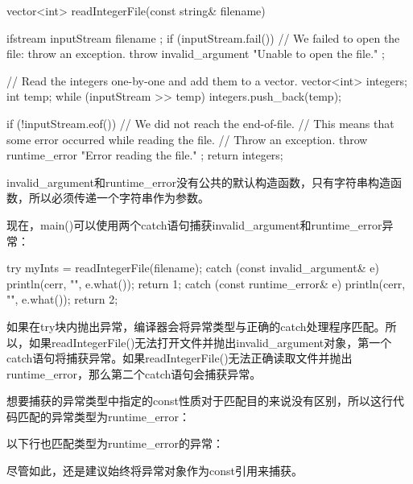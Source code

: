 \begin{cpp}
vector<int> readIntegerFile(const string& filename)
{
    ifstream inputStream { filename };
    if (inputStream.fail()) {
        // We failed to open the file: throw an exception.
        throw invalid_argument { "Unable to open the file." };
    }

    // Read the integers one-by-one and add them to a vector.
    vector<int> integers;
    int temp;
    while (inputStream >> temp) {
        integers.push_back(temp);
    }

    if (!inputStream.eof()) {
        // We did not reach the end-of-file.
        // This means that some error occurred while reading the file.
        // Throw an exception.
        throw runtime_error { "Error reading the file." };
    }
    return integers;
}
\end{cpp}

invalid\_argument和runtime\_error没有公共的默认构造函数，只有字符串构造函数，所以必须传递一个字符串作为参数。

现在，main()可以使用两个catch语句捕获invalid\_argument和runtime\_error异常：

\begin{cpp}
try {
    myInts = readIntegerFile(filename);
} catch (const invalid_argument& e) {
    println(cerr, "{}", e.what());
    return 1;
} catch (const runtime_error& e) {
    println(cerr, "{}", e.what());
    return 2;
}
\end{cpp}

如果在try块内抛出异常，编译器会将异常类型与正确的catch处理程序匹配。所以，如果readIntegerFile()无法打开文件并抛出invalid\_argument对象，第一个catch语句将捕获异常。如果readIntegerFile()无法正确读取文件并抛出runtime\_error，那么第二个catch语句会捕获异常。


想要捕获的异常类型中指定的const性质对于匹配目的来说没有区别，所以这行代码匹配的异常类型为runtime\_error：

\begin{cpp}
} catch (const runtime_error& e) {
\end{cpp}

以下行也匹配类型为runtime\_error的异常：

\begin{cpp}
} catch (runtime_error& e) {
\end{cpp}

尽管如此，还是建议始终将异常对象作为const引用来捕获。


